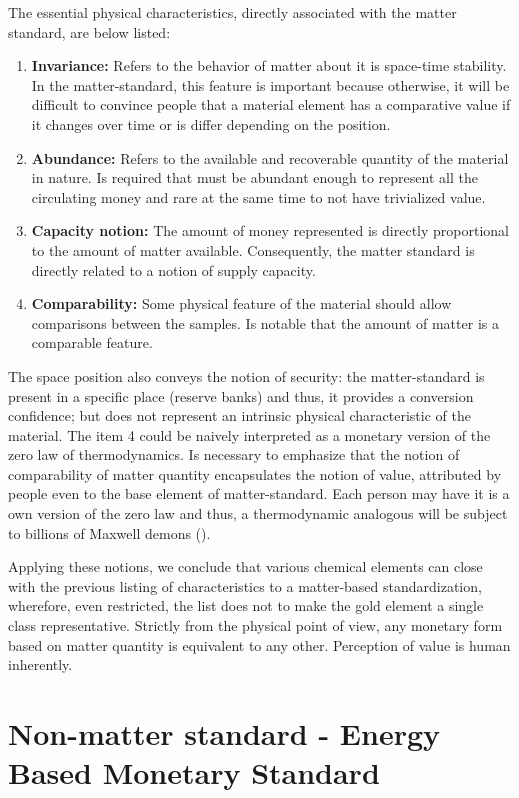 \documentclass[11pt]{article}
\begin{document}
The essential physical characteristics, directly associated with the matter standard, are below listed:
\begin{enumerate}
 \item \textbf{{Invariance:}} Refers to the behavior of matter about it is space-time stability. In the matter-standard, this feature is 
important because otherwise, it will be difficult to convince people that a material element has a comparative value if it changes over 
time 
or is differ depending on the position.
  \item \textbf{{Abundance:}} Refers to the available and recoverable quantity of the material in nature. Is required that must be abundant 
enough to represent all the circulating money and rare at the same time to not have trivialized value.
  \item \textbf{{Capacity notion:}} The amount of money represented is directly proportional to the amount of matter available. 
Consequently, the matter standard is directly related to a notion of supply capacity.
  \item \textbf{{Comparability:}} Some physical feature of the material should allow comparisons between the samples. Is notable that the 
amount of matter is a comparable feature.
\end{enumerate}

The space position also conveys the notion of security: the matter-standard is present in a specific place (reserve banks) and thus, it 
provides a conversion confidence; but does not represent an intrinsic physical characteristic of the material. The item 4 could be naively 
interpreted as a monetary version of the zero law of thermodynamics. Is necessary to emphasize that the notion of comparability of matter 
quantity encapsulates the notion of value, attributed by people even to the base element of matter-standard. Each person may have it is 
a own version of the zero law and thus, a thermodynamic analogous will be subject to billions of Maxwell demons (\citealt{MAXWELL_DEMON}).

Applying these notions, we conclude that various chemical elements can close with the previous listing of characteristics to a matter-based 
standardization, wherefore, even restricted, the list does not to make the gold element a single class representative. Strictly from the 
physical point of view, any monetary form based on matter quantity is equivalent to any other. Perception of value is human inherently.


\section{Non-matter standard - Energy Based Monetary Standard} \label{Non_Matter_Standard}
\end{document}
